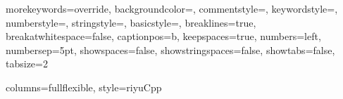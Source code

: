 
\usepackage{listings}
\usepackage{xcolor}


{
morekeywords={override}, %
backgroundcolor=\color{backcolour},   
commentstyle=\color{codegreen},
keywordstyle=\color{magenta},
numberstyle=\tiny\color{codegray},
stringstyle=\color{codepurple},
basicstyle=\footnotesize\linespread{0.5},     
breaklines=true,
breakatwhitespace=false, %
captionpos=b,                    
keepspaces=true,                 
numbers=left,                    
numbersep=5pt,                  
showspaces=false,                
showstringspaces=false,
showtabs=false,          
tabsize=2
}

\lstset
{
columns=fullflexible,
style=riyuCpp
}
